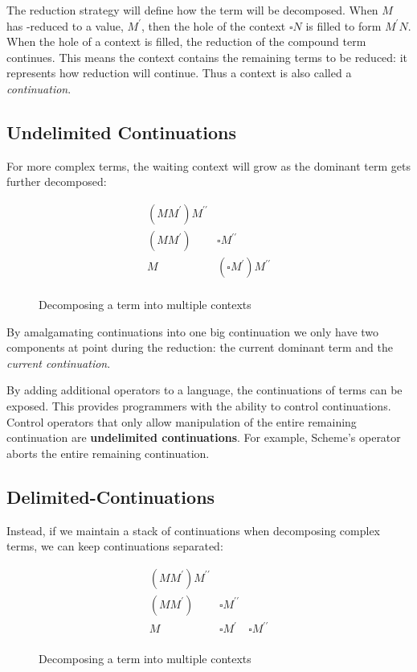   The reduction strategy will define how the term will be decomposed.
  When $M$ has \bta-reduced to a value, $M^\prime$, then the hole of the context $\square N$ is filled to form $M^\prime N$. 
  When the hole of a context is filled, the reduction of the compound term continues.
  This means the context contains the remaining terms to be reduced: it represents how reduction will continue. 
  Thus a context is also called a \emph{continuation}.
 
  \subsection{Undelimited Continuations} 
 
  For more complex terms, the waiting context will grow as the dominant
  term gets further decomposed:
  
  \begin{figure}[!h]
    \[
    \begin{array}{ll}
      (MM^\prime) M^{\prime\prime} \\
      (MM^\prime) & \square M^{\prime\prime} \\
      M & (\square M^\prime) M^{\prime\prime} \\
    \end{array}
    \]
  \caption{Decomposing a term into multiple contexts}
  \end{figure}

  By amalgamating continuations into one big continuation we only have
  two components at point during the reduction: the current dominant term
  and the \emph{current continuation}. 
 
  By adding additional operators to a language, the continuations of terms can be exposed.
  This provides programmers with the ability to control continuations.
  Control operators that only allow manipulation of the entire remaining continuation are \textbf{undelimited continuations}. 
  For example, Scheme's  operator aborts the entire remaining continuation.

  \subsection{Delimited-Continuations}

  Instead, if we maintain a stack of continuations when
  decomposing complex terms, we can keep continuations separated:
  
  \begin{figure}[!h]
    \[
    \begin{array}{lll}
      (MM^\prime) M^{\prime\prime} \\
      (MM^\prime) & \square M^{\prime\prime} \\
      M & \square M^\prime & \square M^{\prime\prime} \\
    \end{array}
    \]
  \caption{Decomposing a term into multiple contexts}
  \end{figure}


